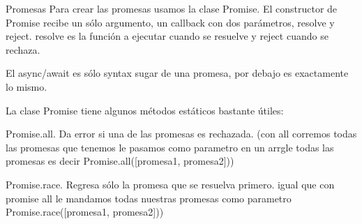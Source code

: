 Promesas
Para crear las promesas usamos la clase Promise. El constructor de Promise recibe un sólo argumento,
un callback con dos parámetros, resolve y reject.
resolve es la función a ejecutar cuando se resuelve y reject cuando se rechaza.

El async/await es sólo syntax sugar de una promesa, por debajo es exactamente lo mismo.

La clase Promise tiene algunos métodos estáticos bastante útiles:

Promise.all. Da error si una de las promesas es rechazada. (con all corremos todas las promesas que tenemos le pasamos como 
parametro en un arrgle todas las promesas es decir Promise.all([promesa1, promesa2]))

Promise.race. Regresa sólo la promesa que se resuelva primero. 
igual que con promise all le mandamos todas nuestras promesas como parametro Promise.race([promesa1, promesa2]))